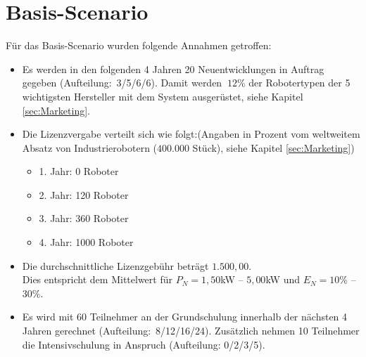 \section{Basis-Scenario}
Für das Basis-Scenario wurden folgende Annahmen getroffen:
\begin{itemize}
	\item Es werden in den folgenden 4 Jahren 20 Neuentwicklungen in Auftrag gegeben (Aufteilung:~3/5/6/6). Damit werden $~12$\% der Robotertypen der 5 wichtigsten Hersteller mit dem System ausgerüstet, siehe Kapitel \ref{sec:Marketing}.
	\item Die Lizenzvergabe verteilt sich wie folgt:\newline (Angaben in Prozent vom weltweitem Absatz von Industrierobotern ($400.000$ Stück), siehe Kapitel \ref{sec:Marketing})
	\begin{itemize}
		\item 1. Jahr: 0 Roboter
		\item 2. Jahr: 120 Roboter
		\item 3. Jahr: 360 Roboter
		\item 4. Jahr: 1000 Roboter
	\end{itemize}
	\item Die durchschnittliche Lizenzgebühr beträgt $1.500,00$\officialeuro.\\ Dies entspricht dem Mittelwert für $P_N = 1,50$kW -- $5,00$kW und $E_N = 10$\% -- $30$\%.
	\item Es wird mit 60 Teilnehmer an der Grundschulung innerhalb der nächsten 4 Jahren gerechnet (Aufteilung:~8/12/16/24). Zusätzlich nehmen 10 Teilnehmer die Intensivschulung in Anspruch (Aufteilung: 0/2/3/5).
\end{itemize}

